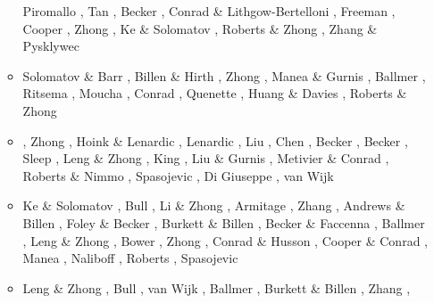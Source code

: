 \begin{itemize}
\begin{scriptsize}
\begin{itemize}
                    Piromallo \etal \cite{pibf06}, Tan \etal \cite{tact06},
                    Becker \etal \cite{besb06}, Conrad \& Lithgow-Bertelloni \cite{coli06},
                    Freeman \etal \cite{frmm06}, Cooper \etal \cite{colm06},
                    Zhong \cite{zhon06}, Ke \& Solomatov \cite{keso06},
                    Roberts \& Zhong \cite{rozh06}, Zhang \& Pysklywec \cite{zhpy06}
\item[\twothousandseven] Solomatov \& Barr \cite{soba07}, Billen \& Hirth \cite{bihi07},
                   Zhong \etal \cite{zhzl07}, Manea \& Gurnis \cite{magu07},
                   Ballmer \etal \cite{bavi07}, Ritsema \etal \cite{rimb07},
                   Moucha \etal \cite{mofm07}, Conrad \etal \cite{cobs07},
                   Quenette \etal \cite{qums07}, Huang \& Davies \cite{huda07},
                   Roberts \& Zhong \cite{rozh07}
\item[\twothousandeight] \cite{gamc08},
                    Zhong \etal \cite{zhmt08}, Hoink \& Lenardic \cite{hole08},
                    Lenardic \etal \cite{lejm08}, Liu \etal \cite{lisg08},
                    Chen \etal \cite{chzy08}, Becker \etal \cite{beke08},
                    Becker \cite{beck08}, Sleep \cite{slee08},
                    Leng \& Zhong \cite{lezh08}, King \cite{king08},
                    Liu \& Gurnis \cite{ligu08}, Metivier \& Conrad \cite{meco08},
                    Roberts \& Nimmo \cite{roni08}, Spasojevic \etal \cite{splg08},
                    Di Giuseppe \etal \cite{divf08}, van Wijk \etal \cite{vavg08}
\item[\twothousandnine] Ke \& Solomatov \cite{keso09}, Bull \etal \cite{bumr09}, 
                    Li \& Zhong \cite{lizh09}, Armitage \etal \cite{arhm09},
                    Zhang \etal \cite{zhzm09}, Andrews \& Billen \cite{anbi09},
                    Foley \& Becker \cite{fobe09}, Burkett \& Billen \cite{bubi09},
                    Becker \& Faccenna \cite{befa09}, Ballmer \etal \cite{bavi09},
                    Leng \& Zhong \cite{lezh09}, Bower \etal \cite{bogj09},
                    Zhong \cite{zhon09}, Conrad \& Husson \cite{cohu09},
                    Cooper \& Conrad \cite{coco09}, Manea \etal \cite{maml09},
                    Naliboff \etal \cite{nacl09}, Roberts \etal \cite{rolm09},
                    Spasojevic \etal \cite{splg09}
\item[\twothousandten] Leng \& Zhong \cite{lezh10}, Bull \etal \cite{bumb10}, 
                 van Wijk \etal \cite{vabv10}, Ballmer \etal  \cite{baiv10},
                 Burkett \& Billen \cite{bubi10}, Zhang \etal \cite{zhzl10},

\end{itemize}
\end{scriptsize}
\end{itemize}
